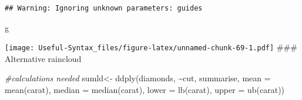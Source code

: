 \documentclass[
]{article}
\newenvironment{Shaded}{\begin{snugshade}}{\end{snugshade}}
\newcommand{\AttributeTok}[1]{\textcolor[rgb]{0.77,0.63,0.00}{#1}}
\newcommand{\CommentTok}[1]{\textcolor[rgb]{0.56,0.35,0.01}{\textit{#1}}}
\newcommand{\FunctionTok}[1]{\textcolor[rgb]{0.00,0.00,0.00}{#1}}
\newcommand{\NormalTok}[1]{#1}
\newcommand{\OtherTok}[1]{\textcolor[rgb]{0.56,0.35,0.01}{#1}}
\newcommand{\SpecialCharTok}[1]{\textcolor[rgb]{0.00,0.00,0.00}{#1}}
\begin{document}
\begin{verbatim}
## Warning: Ignoring unknown parameters: guides
\end{verbatim}

\begin{Shaded}
\begin{Highlighting}[]
\NormalTok{g}
\end{Highlighting}
\end{Shaded}

\texttt{[image: Useful-Syntax\_files/figure-latex/unnamed-chunk-69-1.pdf]}
\#\#\# Alternative raincloud

\begin{Shaded}
\begin{Highlighting}[]
\CommentTok{\#calculations needed}
\NormalTok{sumld}\OtherTok{\textless{}{-}} \FunctionTok{ddply}\NormalTok{(diamonds, }\SpecialCharTok{\textasciitilde{}}\NormalTok{cut, summarise, }\AttributeTok{mean =} \FunctionTok{mean}\NormalTok{(carat), }\AttributeTok{median =} \FunctionTok{median}\NormalTok{(carat), }\AttributeTok{lower =} \FunctionTok{lb}\NormalTok{(carat), }\AttributeTok{upper =} \FunctionTok{ub}\NormalTok{(carat))}


\end{Highlighting}
\end{Shaded}
\end{document}
